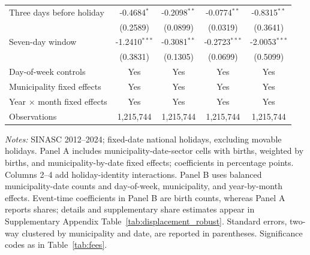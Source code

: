 \begin{table}[H]
{\begin{tabular}{lcccc}
\addlinespace[2pt]
Three days before holiday & -0.4684$^{*}$ & -0.2098$^{**}$ & -0.0774$^{**}$ & -0.8315$^{**}$ \\
 & (0.2589) & (0.0899) & (0.0319) & (0.3641) \\
\addlinespace[2pt]
Seven-day window & -1.2410$^{***}$ & -0.3081$^{**}$ & -0.2723$^{***}$ & -2.0053$^{***}$ \\
 & (0.3831) & (0.1305) & (0.0699) & (0.5099) \\
\addlinespace[2pt]
\midrule
Day-of-week controls & Yes & Yes & Yes & Yes \\
Municipality fixed effects & Yes & Yes & Yes & Yes \\
Year $\times$ month fixed effects & Yes & Yes & Yes & Yes \\
Observations & 1,215,744 & 1,215,744 & 1,215,744 & 1,215,744 \\
\bottomrule
\end{tabular}}
\begin{minipage}{\linewidth}\footnotesize
\textit{Notes:} SINASC 2012--2024; fixed-date national holidays, excluding movable holidays. Panel A includes municipality-date-sector cells with births, weighted by births, and municipality-by-date fixed effects; coefficients in percentage points. Columns 2--4 add holiday-identity interactions. Panel B uses balanced municipality-date counts and day-of-week, municipality, and year-by-month effects. Event-time coefficients in Panel B are birth counts, whereas Panel A reports shares; details and supplementary share estimates appear in Supplementary Appendix Table~\ref{tab:displacement_robust}. Standard errors, two-way clustered by municipality and date, are reported in parentheses. Significance codes as in Table~\ref{tab:fees}.
\end{minipage}
\end{table}
